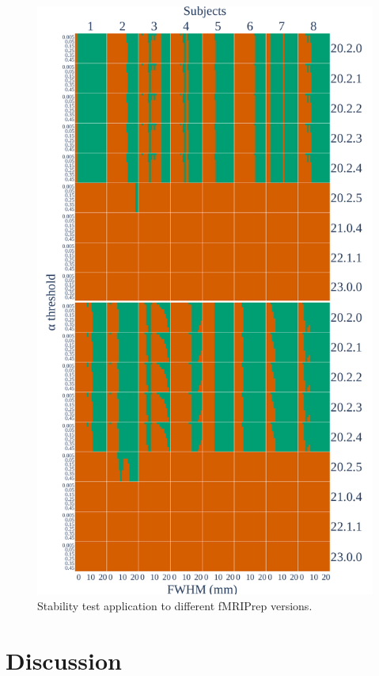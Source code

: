 \documentclass[lettersize,journal]{IEEEtran}
\newcommand{\fmriprep}{fMRIPrep\xspace}
\begin{document}
\begin{figure}
    \centering
    \includegraphics[width=\linewidth]{figures/fmriprep-versions/versions_fwe_bonferroni.pdf}
    \caption{Stability test application to different \fmriprep versions.}
    \label{fig:version_bonferroni}
\end{figure}


\section{Discussion}
\end{document}
